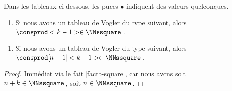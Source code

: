 \begin{fact} \label{vogler-sub-square}
	Dans les tableaux ci-dessous, les puces $\bullet$ indiquent des valeurs quelconques.
	
	\begin{enumerate}
		\item Si nous avons un tableau de Vogler du type suivant, alors $\consprod<k-1> \in \NNssquare$\,.
	\end{enumerate}

	\begin{center}
	\end{center}


	\begin{enumerate}[start=2]
		\item Si nous avons un tableau de Vogler du type suivant, alors $\consprod[n+1]<k-1> \in \NNssquare$\,.
	\end{enumerate}

	\begin{center}
	\end{center}
\end{fact}


\begin{proof}
	Immédiat via le fait \ref{facto-square}, car nous avons soit $n + k \in \NNssquare$\,, soit $n \in \NNssquare$\,.
\end{proof}




